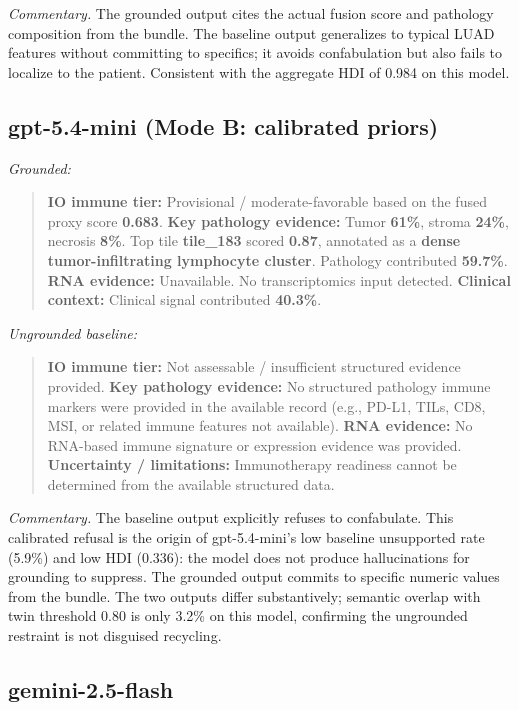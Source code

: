 \documentclass{article}
\theoremstyle{plain}
\begin{document}
\emph{Commentary.} The grounded output cites the actual fusion score and pathology composition from the bundle. The baseline output generalizes to typical LUAD features without committing to specifics; it avoids confabulation but also fails to localize to the patient. Consistent with the aggregate HDI of 0.984 on this model.

\subsection{gpt-5.4-mini (Mode B: calibrated priors)}

\noindent\textit{Grounded:}
\begin{quote}\small
\textbf{IO immune tier:} Provisional / moderate-favorable based on the fused proxy score \textbf{0.683}.
\textbf{Key pathology evidence:} Tumor \textbf{61\%}, stroma \textbf{24\%}, necrosis \textbf{8\%}. Top tile \textbf{tile\_183} scored \textbf{0.87}, annotated as a \textbf{dense tumor-infiltrating lymphocyte cluster}. Pathology contributed \textbf{59.7\%}.
\textbf{RNA evidence:} Unavailable. No transcriptomics input detected.
\textbf{Clinical context:} Clinical signal contributed \textbf{40.3\%}.
\end{quote}

\noindent\textit{Ungrounded baseline:}
\begin{quote}\small
\textbf{IO immune tier:} Not assessable / insufficient structured evidence provided.
\textbf{Key pathology evidence:} No structured pathology immune markers were provided in the available record (e.g., PD-L1, TILs, CD8, MSI, or related immune features not available).
\textbf{RNA evidence:} No RNA-based immune signature or expression evidence was provided.
\textbf{Uncertainty / limitations:} Immunotherapy readiness cannot be determined from the available structured data.
\end{quote}

\emph{Commentary.} The baseline output explicitly refuses to confabulate. This calibrated refusal is the origin of gpt-5.4-mini's low baseline unsupported rate (5.9\%) and low HDI (0.336): the model does not produce hallucinations for grounding to suppress. The grounded output commits to specific numeric values from the bundle. The two outputs differ substantively; semantic overlap with twin threshold 0.80 is only 3.2\% on this model, confirming the ungrounded restraint is not disguised recycling.

\subsection{gemini-2.5-flash}
\end{document}
